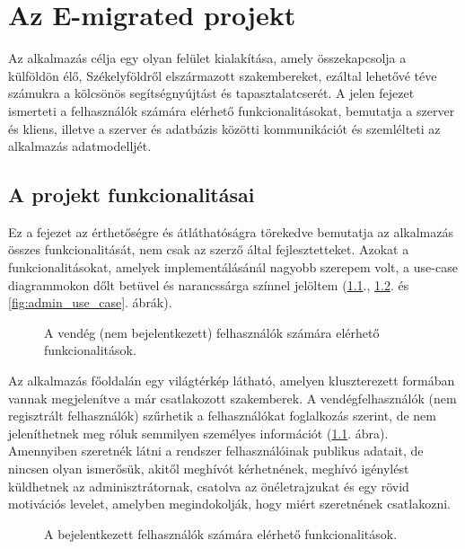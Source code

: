 \chapter{Az E-migrated projekt}\label{ch:projektrol}

\begin{osszefoglal}
Az alkalmazás célja egy olyan felület kialakítása, amely összekapcsolja a külföldön élő, Székelyföldről elszármazott szakembereket, ezáltal lehetővé téve számukra a kölcsönös segítségnyújtást és tapasztalatcserét. A jelen fejezet ismerteti a felhasználók számára elérhető funkcionalitásokat, bemutatja a szerver és kliens, illetve a szerver és adatbázis közötti kommunikációt és szemlélteti az alkalmazás adatmodelljét.
\end{osszefoglal}

\section{A projekt funkcionalitásai}\label{sec:projektrol:funkcionalitasok}

Ez a fejezet az érthetőségre és átláthatóságra törekedve bemutatja az alkalmazás összes funkcionalitását, nem csak az szerző által fejlesztetteket. Azokat a funkcionalitásokat, amelyek implementálásánál nagyobb szerepem volt, a use-case diagrammokon dőlt betüvel és narancssárga színnel jelöltem (\ref{fig:vendeg_use_case}., \ref{fig:felhasznalo_user_case}. és \ref{fig:admin_use_case}. ábrák). 

\begin{figure}
  \centering
  \caption{A vendég (nem bejelentkezett) felhasználók számára elérhető funkcionalitások.}
  \label{fig:vendeg_use_case}
\end{figure}
Az alkalmazás főoldalán egy világtérkép  látható, amelyen kluszterezett formában vannak megjelenítve a már csatlakozott szakemberek. A vendégfelhasználók (nem regisztrált felhasználók) szűrhetik a felhasználókat foglalkozás szerint, de nem jeleníthetnek meg róluk semmilyen személyes információt (\ref{fig:vendeg_use_case}. ábra). Amennyiben szeretnék látni a rendszer felhasználóinak publikus adatait, de nincsen olyan ismerősük, akitől meghívót kérhetnének, meghívó igénylést küldhetnek az adminisztrátornak, csatolva az önéletrajzukat és egy rövid motivációs levelet, amelyben megindokolják, hogy miért szeretnének csatlakozni.

\begin{figure}
  \centering
  \caption{A bejelentkezett felhasználók számára elérhető funkcionalitások.}
  \label{fig:felhasznalo_user_case}
\end{figure}

